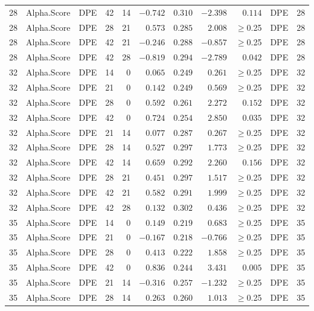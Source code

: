 \documentclass[
]{article}
\begin{document}
\begin{longtable}{cllrrrrrrlc}
28 & Alpha.Score & DPE & 42 & 14 & $-0.742$ & $0.310$ & $-2.398$ & $0.114$ & DPE & 28 \\ 
28 & Alpha.Score & DPE & 28 & 21 & $0.573$ & $0.285$ & $2.008$ & $\geq$0.25 & DPE & 28 \\ 
28 & Alpha.Score & DPE & 42 & 21 & $-0.246$ & $0.288$ & $-0.857$ & $\geq$0.25 & DPE & 28 \\ 
28 & Alpha.Score & DPE & 42 & 28 & $-0.819$ & $0.294$ & $-2.789$ & $0.042$ & DPE & 28 \\ 
32 & Alpha.Score & DPE & 14 & 0 & $0.065$ & $0.249$ & $0.261$ & $\geq$0.25 & DPE & 32 \\ 
32 & Alpha.Score & DPE & 21 & 0 & $0.142$ & $0.249$ & $0.569$ & $\geq$0.25 & DPE & 32 \\ 
32 & Alpha.Score & DPE & 28 & 0 & $0.592$ & $0.261$ & $2.272$ & $0.152$ & DPE & 32 \\ 
32 & Alpha.Score & DPE & 42 & 0 & $0.724$ & $0.254$ & $2.850$ & $0.035$ & DPE & 32 \\ 
32 & Alpha.Score & DPE & 21 & 14 & $0.077$ & $0.287$ & $0.267$ & $\geq$0.25 & DPE & 32 \\ 
32 & Alpha.Score & DPE & 28 & 14 & $0.527$ & $0.297$ & $1.773$ & $\geq$0.25 & DPE & 32 \\ 
32 & Alpha.Score & DPE & 42 & 14 & $0.659$ & $0.292$ & $2.260$ & $0.156$ & DPE & 32 \\ 
32 & Alpha.Score & DPE & 28 & 21 & $0.451$ & $0.297$ & $1.517$ & $\geq$0.25 & DPE & 32 \\ 
32 & Alpha.Score & DPE & 42 & 21 & $0.582$ & $0.291$ & $1.999$ & $\geq$0.25 & DPE & 32 \\ 
32 & Alpha.Score & DPE & 42 & 28 & $0.132$ & $0.302$ & $0.436$ & $\geq$0.25 & DPE & 32 \\ 
35 & Alpha.Score & DPE & 14 & 0 & $0.149$ & $0.219$ & $0.683$ & $\geq$0.25 & DPE & 35 \\ 
35 & Alpha.Score & DPE & 21 & 0 & $-0.167$ & $0.218$ & $-0.766$ & $\geq$0.25 & DPE & 35 \\ 
35 & Alpha.Score & DPE & 28 & 0 & $0.413$ & $0.222$ & $1.858$ & $\geq$0.25 & DPE & 35 \\ 
35 & Alpha.Score & DPE & 42 & 0 & $0.836$ & $0.244$ & $3.431$ & $0.005$ & DPE & 35 \\ 
35 & Alpha.Score & DPE & 21 & 14 & $-0.316$ & $0.257$ & $-1.232$ & $\geq$0.25 & DPE & 35 \\ 
35 & Alpha.Score & DPE & 28 & 14 & $0.263$ & $0.260$ & $1.013$ & $\geq$0.25 & DPE & 35 \\ 

\end{longtable}
\end{document}
